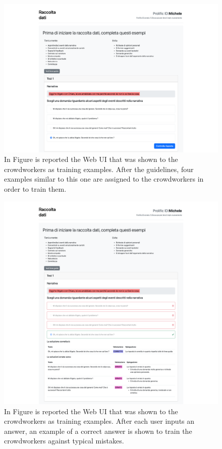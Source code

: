 \begin{figure}[!htbp]
    \centering
    \includegraphics[width=1\linewidth]{assets//imgs/UI-examples-1.png}
    \caption{In Figure is reported the Web UI that was shown to the crowdworkers as training examples. After the guidelines, four examples similar to this one are assigned to the crowdworkers in order to train them.}
    \label{fig:data_collection_web:2}
\end{figure}
\begin{figure}[!htbp]
    \centering
    \includegraphics[width=1\linewidth]{assets//imgs/UI-examples-completed-1.png}
    \caption{In Figure is reported the Web UI that was shown to the crowdworkers as training examples. After each user inputs an answer, an example of a correct answer is shown to train the crowdworkers against typical mistakes.}
    \label{fig:data_collection_web:3}
\end{figure}
